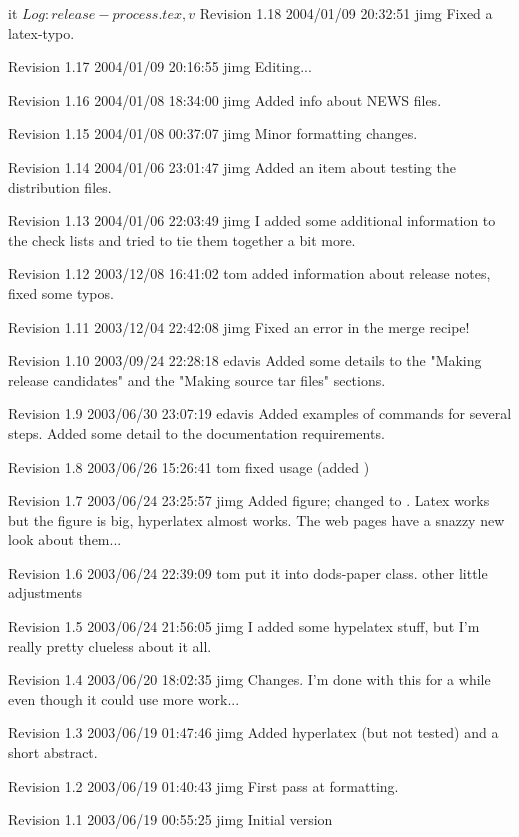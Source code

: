 \documentclass{dods-paper}
\begin{document}
\begin{vcode}{it}
  $Log: release-process.tex,v $
  Revision 1.18  2004/01/09 20:32:51  jimg
  Fixed a latex-typo.

  Revision 1.17  2004/01/09 20:16:55  jimg
  Editing...

  Revision 1.16  2004/01/08 18:34:00  jimg
  Added info about NEWS files.

  Revision 1.15  2004/01/08 00:37:07  jimg
  Minor formatting changes.

  Revision 1.14  2004/01/06 23:01:47  jimg
  Added an item about testing the distribution files.

  Revision 1.13  2004/01/06 22:03:49  jimg
  I added some additional information to the check lists and tried to tie them
  together a bit more.

  Revision 1.12  2003/12/08 16:41:02  tom
  added information about release notes, fixed some typos.

  Revision 1.11  2003/12/04 22:42:08  jimg
  Fixed an error in the merge recipe!

  Revision 1.10  2003/09/24 22:28:18  edavis
  Added some details to the "Making release candidates" and the "Making
  source tar files" sections.

  Revision 1.9  2003/06/30 23:07:19  edavis
  Added examples of commands for several steps. Added some detail
  to the documentation requirements.

  Revision 1.8  2003/06/26 15:26:41  tom
  fixed \figureplace usage (added \figpath)

  Revision 1.7  2003/06/24 23:25:57  jimg
  Added figure; changed to \figureplace. Latex works but the figure is big,
  hyperlatex almost works. The web pages have a snazzy new look about them...

  Revision 1.6  2003/06/24 22:39:09  tom
  put it into dods-paper class. other little adjustments

  Revision 1.5  2003/06/24 21:56:05  jimg
  I added some hypelatex stuff, but I'm really pretty clueless about it all.

  Revision 1.4  2003/06/20 18:02:35  jimg
  Changes. I'm done with this for a while even though it could use more work...

  Revision 1.3  2003/06/19 01:47:46  jimg
  Added hyperlatex (but not tested) and a short abstract.

  Revision 1.2  2003/06/19 01:40:43  jimg
  First pass at formatting.

  Revision 1.1  2003/06/19 00:55:25  jimg
  Initial version

\end{vcode}
\end{document}
